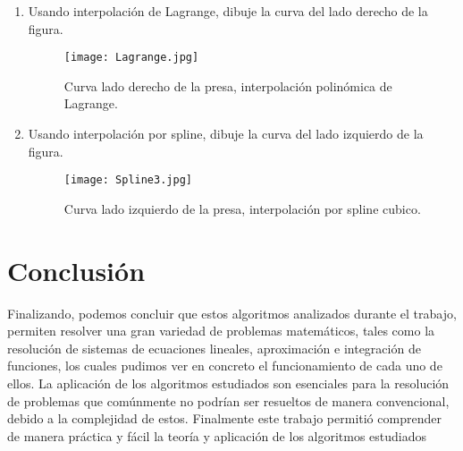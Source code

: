 \documentclass{udpreport}
\begin{document}
\begin{enumerate}
\begin{enumerate}
 \vspace{0.8cm}
 
 \item Usando interpolación de Lagrange, dibuje la curva del lado derecho de la  figura.
 
  \begin{figure}[H]
    \centering
    \texttt{[image: Lagrange.jpg]}
    \caption{Curva lado derecho de la presa, interpolación polinómica de Lagrange.} \label{fig:curva_derecha_lagrange}
  
\end{figure}


 \item Usando interpolación por spline, dibuje la curva del lado izquierdo de la  figura.
 \\
 \begin{figure}[H]
    \centering
    \texttt{[image: Spline3.jpg]}
    \caption{Curva lado izquierdo de la presa, interpolación por spline cubico.} \label{fig:curvaizq_spline}
\end{figure}
    


 \end{enumerate}
 \end{enumerate}

\newpage

    
    
\chapter{Conclusión}
Finalizando, podemos concluir que estos algoritmos analizados durante el trabajo, permiten resolver una gran variedad de problemas matemáticos, tales como la resolución de sistemas de ecuaciones lineales, aproximación e integración de funciones, los cuales pudimos ver  en concreto el funcionamiento de cada uno de ellos. La aplicación de los algoritmos estudiados son esenciales para la resolución de problemas que comúnmente no podrían ser resueltos de manera convencional, debido a la complejidad de estos. Finalmente este trabajo permitió comprender de manera práctica y fácil la teoría y aplicación de los algoritmos estudiados
\end{document}
